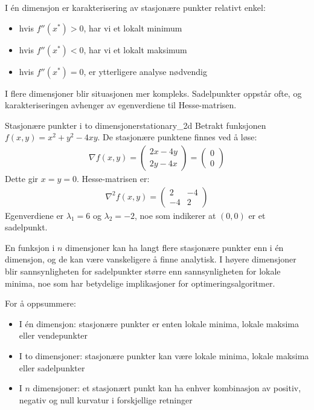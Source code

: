I én dimensjon er karakterisering av stasjonære punkter relativt enkel:
\begin{itemize}
	\item hvis \(f''(x^\ast) > 0\), har vi et lokalt minimum
	\item hvis \(f''(x^\ast) < 0\), har vi et lokalt maksimum
	\item hvis \(f''(x^\ast) = 0\), er ytterligere analyse nødvendig
\end{itemize}

I flere dimensjoner blir situasjonen mer kompleks. Sadelpunkter oppstår ofte, og karakteriseringen avhenger av egenverdiene til Hesse-matrisen.

\begin{example}{Stasjonære punkter i to dimensjoner}{stationary_2d}
	Betrakt funksjonen \(f(x,y) = x^2 + y^2 - 4xy\). De stasjonære punktene finnes ved å løse:
	\begin{align*}
		\nabla f(x,y) = \begin{pmatrix} 2x - 4y \\ 2y - 4x \end{pmatrix} = \begin{pmatrix} 0 \\ 0 \end{pmatrix}
	\end{align*}
	Dette gir \(x = y = 0\). Hesse-matrisen er:
	\begin{align*}
		\nabla^2 f(x,y) = \begin{pmatrix} 2 & -4 \\ -4 & 2 \end{pmatrix}
	\end{align*}
	Egenverdiene er \(\lambda_1 = 6\) og \(\lambda_2 = -2\), noe som indikerer at \((0,0)\) er et sadelpunkt.
\end{example}

En funksjon i \(n\) dimensjoner kan ha langt flere stasjonære punkter enn i én dimensjon, og de kan være vanskeligere å finne analytisk. I høyere dimensjoner blir sannsynligheten for sadelpunkter større enn sannsynligheten for lokale minima, noe som har betydelige implikasjoner for optimeringsalgoritmer.

For å oppsummere:
\begin{itemize}
	\item I én dimensjon: stasjonære punkter er enten lokale minima, lokale maksima eller vendepunkter
	\item I to dimensjoner: stasjonære punkter kan være lokale minima, lokale maksima eller sadelpunkter
	\item I \(n\) dimensjoner: et stasjonært punkt kan ha enhver kombinasjon av positiv, negativ og null kurvatur i forskjellige retninger
\end{itemize}

